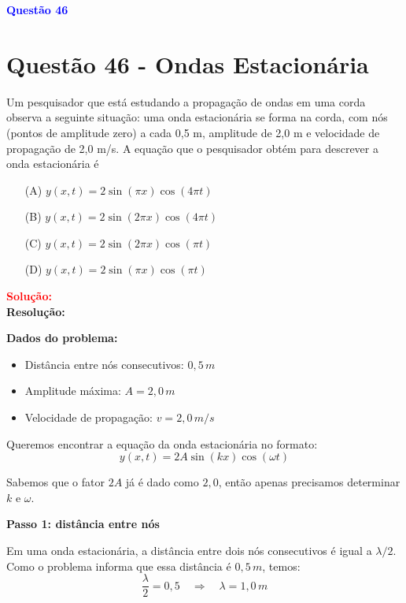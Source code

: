 \documentclass[a4paper,12pt]{article}
\begin{document}
\begin{flushleft}
\textbf{\textcolor{blue}{\Large Quest\~ao 46}}\\
\noindent
\section{Quest\~ao 46 - Ondas Estacionária}
Um pesquisador que está estudando a propagação de ondas em uma corda observa a seguinte situação: uma
onda estacionária se forma na corda, com nós (pontos de amplitude zero) a cada 0,5 m, amplitude de 2,0 m e
velocidade de propagação de 2,0 m/s. A equação que o pesquisador obtém para descrever a onda estacionária é

\begin{itemize}
\item[(A)] $y(x,t) = 2\sin(\pi x)\cos(4\pi t)$
\item[(B)] $y(x,t) = 2\sin(2\pi x)\cos(4\pi t)$
\item[(C)] $y(x,t) = 2\sin(2\pi x)\cos(\pi t)$
\item[(D)] $y(x,t) = 2\sin(\pi x)\cos(\pi t)$
\end{itemize}

\vspace{0.5cm}

\textcolor{red}{\textbf{Solução:}}\\

\textbf{Resolução:}

\bigskip

\textbf{Dados do problema:}
\begin{itemize}
    \item Distância entre nós consecutivos: \(0{,}5\,m\)
    \item Amplitude máxima: \(A = 2,0\,m\)
    \item Velocidade de propagação: \(v = 2,0\,m/s\)
\end{itemize}

Queremos encontrar a equação da onda estacionária no formato:
\[
y(x,t) = 2A \sin(kx) \cos(\omega t)
\]

Sabemos que o fator \(2A\) já é dado como \(2,0\), então apenas precisamos determinar \(k\) e \(\omega\).

\bigskip

\textbf{Passo 1: distância entre nós}

Em uma onda estacionária, a distância entre dois nós consecutivos é igual a \(\lambda/2\).  
Como o problema informa que essa distância é \(0{,}5\,m\), temos:
\[
\frac{\lambda}{2} = 0{,}5 \quad \Longrightarrow \quad \lambda = 1,0\,m
\]


\end{flushleft}
\end{document}
